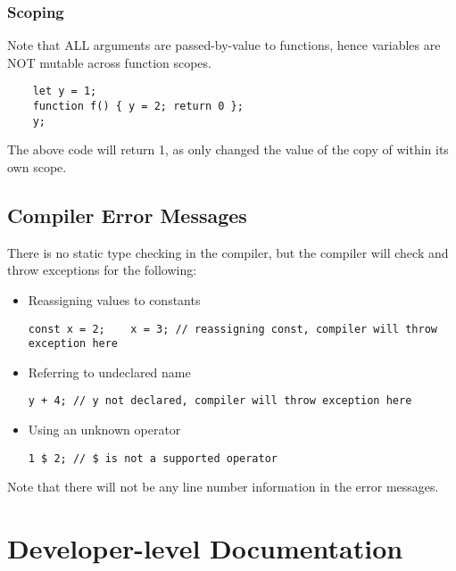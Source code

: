 
\subsubsection{Scoping}
Note that ALL arguments are passed-by-value to functions, hence variables are NOT mutable across function scopes. 
\begin{verbatim}
    let y = 1;
    function f() { y = 2; return 0 };
    y;
\end{verbatim}
The above code will return 1, as  only changed the value of the copy of  within its own scope. 
\newpage
\subsection{Compiler Error Messages}
There is no static type checking in the compiler, but the compiler will check and throw exceptions for the following: 
\begin{itemize}
\item Reassigning values to constants
\begin{verbatim}
const x = 2;    x = 3; // reassigning const, compiler will throw exception here
\end{verbatim}
\item Referring to undeclared name
\begin{verbatim}
y + 4; // y not declared, compiler will throw exception here
\end{verbatim}
\item Using an unknown operator
\begin{verbatim}
1 $ 2; // $ is not a supported operator
\end{verbatim}

\end{itemize}
Note that there will not be any line number information in the error messages.
\pagebreak
\section{Developer-level Documentation}
